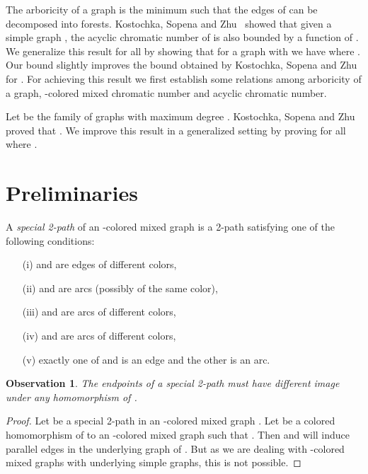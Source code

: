 \documentclass[11pt]{article}
\newtheorem{observation}{Observation}
\begin{document}
The arboricity  of a graph  is the minimum  such that the edges of  can be decomposed into  forests. 
Kostochka, Sopena and Zhu~\cite{Kostochka97acyclicand} showed that given a simple graph , the acyclic chromatic number  of  is also bounded by a function of  . 
We generalize this result for all  by showing that for a graph  with 
 we have 
 where . Our bound slightly improves the bound obtained by  Kostochka, Sopena and Zhu~\cite{Kostochka97acyclicand} for .
For achieving this result we first establish some relations among arboricity of a graph, -colored mixed chromatic number and 
acyclic chromatic number. 



 Let  be the family of graphs with maximum degree  .
Kostochka, Sopena and Zhu~\cite{Kostochka97acyclicand} proved that .
We improve this result in a generalized setting by proving  for all   where 
.



\section{Preliminaries}

A \textit{special 2-path}  of an -colored mixed graph  is a 2-path satisfying one of the following conditions:

\begin{itemize}
\item[(i)]  and  are edges of different colors,

\item[(ii)]  and  are arcs (possibly of the same color),

\item[(iii)]  and  are arcs of different colors,

\item[(iv)]  and  are arcs of different colors,

\item[(v)] exactly one of  and  is an edge and the other is an arc.
\end{itemize}




\begin{observation}\label{special}
The endpoints of a special 2-path must have different image under any homomorphism of .
\end{observation}

\begin{proof}
Let  be a special 2-path in an -colored mixed graph . Let  be a colored homomorphism of  to an
-colored mixed graph  such that . Then  and   will induce parallel edges in the underlying graph of .
But as we are dealing with -colored mixed graphs with underlying simple graphs, this is not possible. 
\end{proof}
\end{document}
